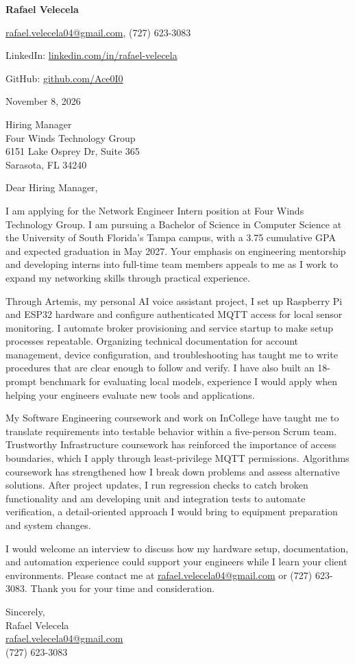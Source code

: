 \documentclass[11pt]{article}
\begin{document}
{\fontsize{14}{16}\selectfont\bfseries Rafael Velecela}\par
\href{mailto:rafael.velecela04@gmail.com}{rafael.velecela04@gmail.com}, (727) 623-3083\par
LinkedIn: \href{https://www.linkedin.com/in/rafael-velecela/}{linkedin.com/in/rafael-velecela}\par
GitHub: \href{https://github.com/Ace0I0}{github.com/Ace0I0}

\medskip
November 8, 2026\par
\medskip
Hiring Manager\\
Four Winds Technology Group\\
6151 Lake Osprey Dr, Suite 365\\
Sarasota, FL 34240

\medskip
Dear Hiring Manager,

\medskip
I am applying for the Network Engineer Intern position at Four Winds Technology Group. I am pursuing a Bachelor of Science in Computer Science at the University of South Florida's Tampa campus, with a 3.75 cumulative GPA and expected graduation in May 2027. Your emphasis on engineering mentorship and developing interns into full-time team members appeals to me as I work to expand my networking skills through practical experience.

\medskip
Through Artemis, my personal AI voice assistant project, I set up Raspberry Pi and ESP32 hardware and configure authenticated MQTT access for local sensor monitoring. I automate broker provisioning and service startup to make setup processes repeatable. Organizing technical documentation for account management, device configuration, and troubleshooting has taught me to write procedures that are clear enough to follow and verify. I have also built an 18-prompt benchmark for evaluating local models, experience I would apply when helping your engineers evaluate new tools and applications.

\medskip
My Software Engineering coursework and work on InCollege have taught me to translate requirements into testable behavior within a five-person Scrum team. Trustworthy Infrastructure coursework has reinforced the importance of access boundaries, which I apply through least-privilege MQTT permissions. Algorithms coursework has strengthened how I break down problems and assess alternative solutions. After project updates, I run regression checks to catch broken functionality and am developing unit and integration tests to automate verification, a detail-oriented approach I would bring to equipment preparation and system changes.

\medskip
I would welcome an interview to discuss how my hardware setup, documentation, and automation experience could support your engineers while I learn your client environments. Please contact me at \href{mailto:rafael.velecela04@gmail.com}{rafael.velecela04@gmail.com} or (727) 623-3083. Thank you for your time and consideration.

\medskip
Sincerely,\\
Rafael Velecela\\
\href{mailto:rafael.velecela04@gmail.com}{rafael.velecela04@gmail.com}\\
(727) 623-3083
\end{document}
